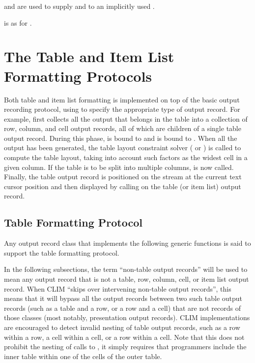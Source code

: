  and  are used to supply  and
 to an implicitly used .

 is as for .


\section {The Table and Item List Formatting Protocols}

Both table and item list formatting is implemented on top of the basic output
recording protocol, using  to specify the appropriate
type of output record.  For example,  first collects all
the output that belongs in the table into a collection of row, column, and cell
output records, all of which are children of a single table output record.
During this phase,  is bound to  and
 is bound to .  When all the output has been
generated, the table layout constraint solver ( or
) is called to compute the table layout, taking into
account such factors as the widest cell in a given column.  If the table is to
be split into multiple columns,  is now called.
Finally, the table output record is positioned on the stream at the current text
cursor position and then displayed by calling  on the table (or item
list) output record.


\subsection {Table Formatting Protocol}

Any output record class that implements the following generic functions is said
to support the table formatting protocol.

In the following subsections, the term ``non-table output records'' will be used
to mean any output record that is not a table, row, column, cell, or item list
output record.  When CLIM ``skips over intervening non-table output records'',
this means that it will bypass all the output records between two such table
output records (such as a table and a row, or a row and a cell) that are not
records of those classes (most notably, presentation output records).  CLIM
implementations are encouraged to detect invalid nesting of table output
records, such as a row within a row, a cell within a cell, or a row within a
cell.  Note that this does not prohibit the nesting of calls to
, it simply requires that programmers include the inner
table within one of the cells of the outer table.


